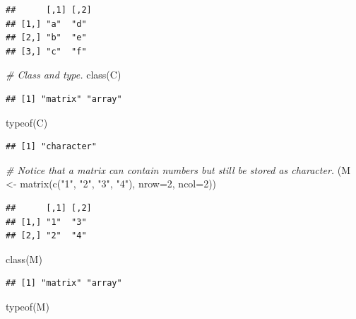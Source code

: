 \documentclass[
]{book}
\newenvironment{Shaded}{\begin{snugshade}}{\end{snugshade}}
\newcommand{\AttributeTok}[1]{\textcolor[rgb]{0.77,0.63,0.00}{#1}}
\newcommand{\CommentTok}[1]{\textcolor[rgb]{0.56,0.35,0.01}{\textit{#1}}}
\newcommand{\DecValTok}[1]{\textcolor[rgb]{0.00,0.00,0.81}{#1}}
\newcommand{\FunctionTok}[1]{\textcolor[rgb]{0.00,0.00,0.00}{#1}}
\newcommand{\NormalTok}[1]{#1}
\newcommand{\OtherTok}[1]{\textcolor[rgb]{0.56,0.35,0.01}{#1}}
\newcommand{\StringTok}[1]{\textcolor[rgb]{0.31,0.60,0.02}{#1}}
\begin{document}
\begin{verbatim}
##      [,1] [,2]
## [1,] "a"  "d" 
## [2,] "b"  "e" 
## [3,] "c"  "f"
\end{verbatim}

\begin{Shaded}
\begin{Highlighting}[]
\CommentTok{\# Class and type.}
\FunctionTok{class}\NormalTok{(C)}
\end{Highlighting}
\end{Shaded}

\begin{verbatim}
## [1] "matrix" "array"
\end{verbatim}

\begin{Shaded}
\begin{Highlighting}[]
\FunctionTok{typeof}\NormalTok{(C)}
\end{Highlighting}
\end{Shaded}

\begin{verbatim}
## [1] "character"
\end{verbatim}

\begin{Shaded}
\begin{Highlighting}[]
\CommentTok{\# Notice that a matrix can contain numbers but still be stored as character.}
\NormalTok{(M }\OtherTok{\textless{}{-}} \FunctionTok{matrix}\NormalTok{(}\FunctionTok{c}\NormalTok{(}\StringTok{"1"}\NormalTok{, }\StringTok{"2"}\NormalTok{, }\StringTok{"3"}\NormalTok{, }\StringTok{"4"}\NormalTok{), }\AttributeTok{nrow=}\DecValTok{2}\NormalTok{, }\AttributeTok{ncol=}\DecValTok{2}\NormalTok{))}
\end{Highlighting}
\end{Shaded}

\begin{verbatim}
##      [,1] [,2]
## [1,] "1"  "3" 
## [2,] "2"  "4"
\end{verbatim}

\begin{Shaded}
\begin{Highlighting}[]
\FunctionTok{class}\NormalTok{(M)}
\end{Highlighting}
\end{Shaded}

\begin{verbatim}
## [1] "matrix" "array"
\end{verbatim}

\begin{Shaded}
\begin{Highlighting}[]
\FunctionTok{typeof}\NormalTok{(M)}
\end{Highlighting}
\end{Shaded}
\end{document}
